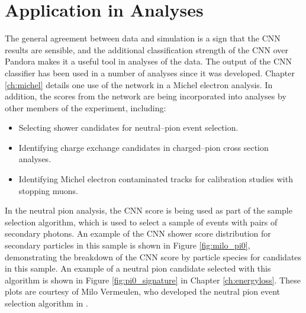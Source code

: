 \section{Application in \protodune{} Analyses} \label{cnn-appl}
The general agreement between data and simulation is a sign that the CNN results
are sensible, and the additional classification strength of the CNN over
Pandora makes it a useful tool in analyses of the \protodune{} data. The 
output of the CNN classifier has been used in a number of \protodune{} 
analyses since it was developed. Chapter \ref{ch:michel} details one use of 
the network in a Michel electron analysis. In addition, the scores from the 
network are being incorporated into analyses by other members of the 
\protodune{} experiment, including:
\begin{itemize}
	\item Selecting shower candidates for neutral--pion event selection\cite{pi_0}.
	\item Identifying charge exchange candidates in charged--pion cross section 
		analyses\cite{pion_exchange}.
	\item Identifying Michel electron contaminated tracks for calibration studies
		with stopping muons\cite{fabio_muon}.
\end{itemize}

\noindent
In the neutral pion analysis, the CNN score is being used as part of the 
sample selection algorithm, which is used to select a sample of events with
pairs of secondary photons. An example of the CNN shower score distribution for
secondary particles in this sample is shown in Figure \ref{fig:milo_pi0}, 
demonstrating the breakdown of the CNN score by particle species for candidates
in this sample. An example of a neutral pion candidate selected with this
algorithm is shown in Figure \ref{fig:pi0_signature} in Chapter 
\ref{ch:energyloss}. These plots are courtesy of Milo Vermeulen, who 
developed the neutral pion event selection algorithm in \protodune{}\cite{pi_0}.

